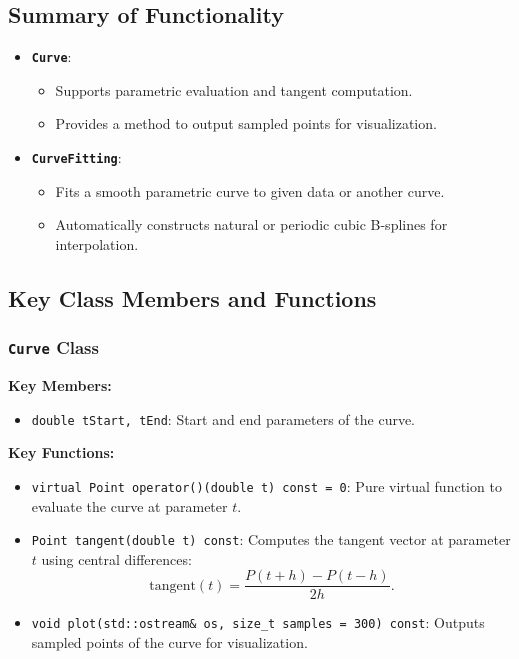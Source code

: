 \documentclass[a4paper]{article}
\begin{document}
\subsection{Summary of Functionality}

\begin{itemize}
    \item \textbf{\texttt{Curve}}:
    \begin{itemize}
        \item Supports parametric evaluation and tangent computation.
        \item Provides a method to output sampled points for visualization.
    \end{itemize}
    \item \textbf{\texttt{CurveFitting}}:
    \begin{itemize}
        \item Fits a smooth parametric curve to given data or another curve.
        \item Automatically constructs natural or periodic cubic B-splines for interpolation.
    \end{itemize}
\end{itemize}


\subsection{Key Class Members and Functions}

\subsubsection{\texttt{Curve} Class}

\textbf{Key Members:}
\begin{itemize}
    \item \texttt{double tStart, tEnd}: Start and end parameters of the curve.
\end{itemize}

\textbf{Key Functions:}
\begin{itemize}
    \item \texttt{virtual Point operator()(double t) const = 0}:
    Pure virtual function to evaluate the curve at parameter $t$.
    \item \texttt{Point tangent(double t) const}:
    Computes the tangent vector at parameter $t$ using central differences:
    \[
    \text{tangent}(t) = \frac{P(t + h) - P(t - h)}{2h}.
    \]
    \item \texttt{void plot(std::ostream\& os, size\_t samples = 300) const}:
    Outputs sampled points of the curve for visualization.
\end{itemize}
\end{document}
